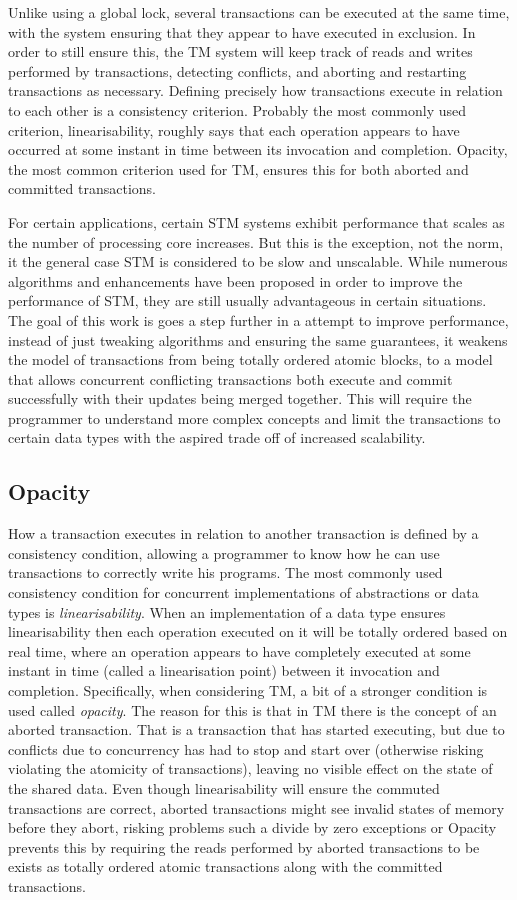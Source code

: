 \documentclass[11pt,letterpaper]{article}
\begin{document}
Unlike using a global lock, several transactions can be executed at the same time,
with the system ensuring that they appear to have executed in exclusion.
In order to still ensure this, the TM system will keep track of reads and writes
performed by transactions, detecting conflicts, and aborting and restarting transactions
as necessary.
Defining precisely how transactions execute in relation to each other is a consistency criterion.
Probably the most commonly used criterion, linearisability, roughly says that each
operation appears to have occurred at some instant in time between its invocation and completion.
Opacity, the most common criterion used for TM, ensures this for both aborted and committed transactions.

For certain applications, certain STM systems exhibit performance that scales as the number
of processing core increases.
But this is the exception, not the norm, it the general case STM is considered to be slow
and unscalable.
While numerous algorithms and enhancements have been proposed in order to improve the performance
of STM, they are still usually advantageous in certain situations.
The goal of this work is goes a step further in a attempt to improve performance, instead of 
just tweaking algorithms and ensuring the same guarantees, it weakens the model of transactions
from being totally ordered atomic blocks, to a model that allows concurrent conflicting transactions
both execute and commit successfully with their updates being merged together.
This will require the programmer to understand more complex concepts and limit the transactions
to certain data types with the aspired trade off of increased scalability.

\subsection{Opacity}
How a transaction executes in relation to another transaction is defined by a consistency condition,
allowing a programmer to know how he can use transactions to correctly write his programs.
The most commonly used consistency condition for concurrent implementations of abstractions or data types
is \emph{linearisability}.
When an implementation of a data type ensures linearisability then each operation executed on it will
be totally ordered based on real time, where an operation appears to have completely executed at
some instant in time (called a linearisation point) between it invocation and completion.
Specifically, when considering TM, a bit of a stronger condition is used called \emph{opacity}.
The reason for this is that in TM there is the concept of an aborted transaction.
That is a transaction that has started executing, but due to conflicts due to concurrency
has had to stop and start over (otherwise risking violating the atomicity of transactions),
leaving no visible effect on the state of the shared data.
Even though linearisability will ensure the commuted transactions are correct, aborted transactions
might see invalid states of memory before they abort, risking problems such a divide by zero exceptions
or 
Opacity prevents this by requiring the reads performed by aborted transactions to be exists
as totally ordered atomic transactions along with the committed transactions.
\end{document}
